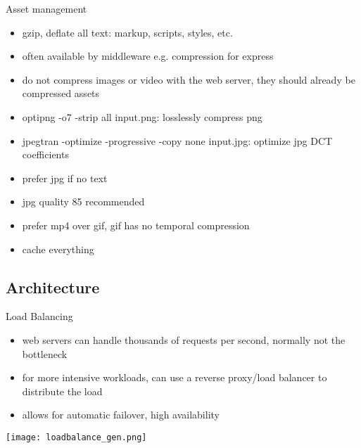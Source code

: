 \documentclass{beamer}
\begin{document}
\begin{frame}{Asset management}
  \begin{itemize}
    \item gzip, deflate all text: markup, scripts, styles, etc.
    \item often available by middleware e.g. compression for express
    \item do not compress images or video with the web server, they should
      already be compressed assets
    \item optipng -o7 -strip all input.png: losslessly compress png
    \item jpegtran -optimize -progressive -copy none input.jpg: optimize jpg
      DCT coefficients
    \item prefer jpg if no text
    \item jpg quality 85 recommended
    \item prefer mp4 over gif, gif has no temporal compression
    \item cache everything
  \end{itemize}
\end{frame}

\subsection{Architecture}

\begin{frame}{Load Balancing}
  \begin{itemize}
    \item web servers can handle thousands of requests per second, normally not
      the bottleneck
    \item for more intensive workloads, can use a reverse proxy/load balancer to
      distribute the load
    \item allows for automatic failover, high availability
  \end{itemize}
  \texttt{[image: loadbalance\_gen.png]}
\end{frame}
\end{document}
